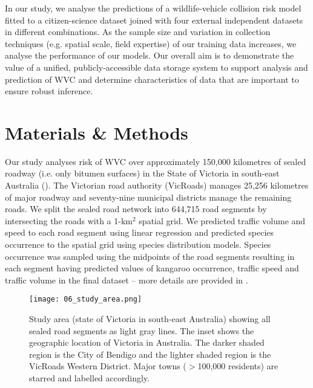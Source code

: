 In our study, we analyse the predictions of a wildlife-vehicle collision risk model fitted to a citizen-science dataset joined with four external independent datasets in different combinations. As the sample size and variation in collection techniques (e.g. spatial scale, field expertise) of our training data increases, we analyse the performance of our models. Our overall aim is to demonstrate the value of a unified, publicly-accessible data storage system to support analysis and prediction of WVC and determine characteristics of data that are important to ensure robust inference.

\section{Materials \& Methods}

Our study analyses risk of WVC over approximately 150,000 kilometres of sealed roadway (i.e. only bitumen surfaces) in the State of Victoria in south-east Australia (). The Victorian road authority (VicRoads) manages 25,256 kilometres of major roadway and seventy-nine municipal districts manage the remaining roads. We split the sealed road network into 644,715 road segments by intersecting the roads with a 1-km$^2$ spatial grid. We predicted traffic volume and speed to each road segment using linear regression and predicted species occurrence to the spatial grid using species distribution models. Species occurrence was sampled using the midpoints of the road segments resulting in each segment having predicted values of kangaroo occurrence, traffic speed and traffic volume in the final dataset -- more details are provided in . 

\begin{figure*}[!t]
  \centering
  \texttt{[image: 06\_study\_area.png]}
  \caption[Study area for model validation]{Study area (state of Victoria in south-east Australia) showing all sealed road segments as light gray lines. The inset shows the geographic location of Victoria in Australia. The darker shaded region is the City of Bendigo and the lighter shaded region is the VicRoads Western District. Major towns ($>$100,000 residents) are starred and labelled accordingly.}
  \label{val_study_area}
\end{figure*}

